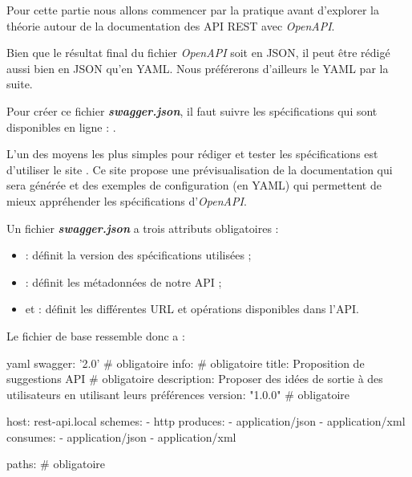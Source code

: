 \documentclass[big]{zmdocument}
\begin{document}
Pour cette partie nous allons commencer par la pratique avant d'explorer la théorie autour de la documentation des API REST avec \textit{OpenAPI}.







Bien que le résultat final du fichier \textit{OpenAPI} soit en JSON, il peut être rédigé aussi bien en JSON qu'en YAML. Nous préférerons d'ailleurs le YAML par la suite.



Pour créer ce fichier \textbf{\textit{swagger.json}}, il faut suivre les spécifications qui sont disponibles en ligne : .



L'un des moyens les plus simples pour rédiger et tester les spécifications est d'utiliser le site . Ce site propose une prévisualisation de la documentation qui sera générée et des exemples de configuration (en YAML) qui permettent de mieux appréhender les spécifications d'\textit{OpenAPI}.





Un fichier \textbf{\textit{swagger.json}} a trois attributs obligatoires :



\begin{itemize}
\item {} : définit la version des spécifications utilisées ;
\item {} : définit les métadonnées de notre API ;
\item et  : définit les différentes URL et opérations disponibles dans l'API.
\end{itemize}


Le fichier de base ressemble donc a :



\begin{CodeBlock}{yaml}
swagger: '2.0' # obligatoire
info: # obligatoire
  title: Proposition de suggestions API    # obligatoire
  description: Proposer des idées de sortie à des utilisateurs en utilisant leurs préférences
  version: "1.0.0" # obligatoire

host: rest-api.local
schemes:
  - http
produces:
  - application/json
  - application/xml
consumes:
  - application/json
  - application/xml
  
paths: # obligatoire
\end{CodeBlock}
\end{document}

